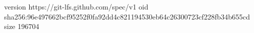 version https://git-lfs.github.com/spec/v1
oid sha256:96e497662bcf95252f0fa92dd4c821194530eb64c26300723cf228fb34b655cd
size 196704
